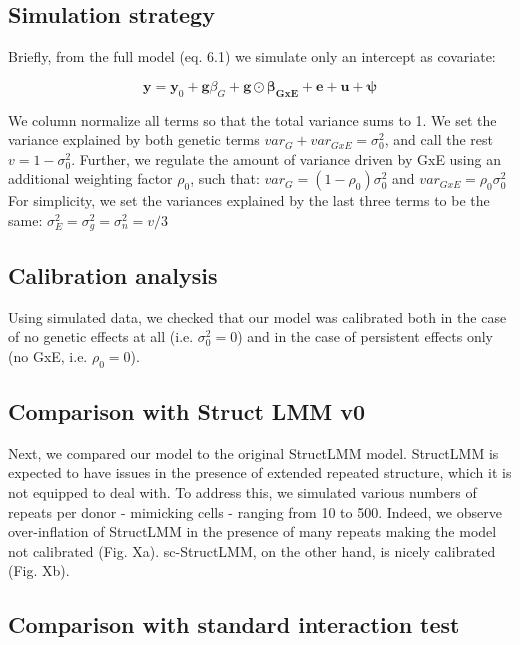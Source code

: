 \subsection{Simulation strategy}
Briefly, from the full model (eq. 6.1) we simulate only an intercept as covariate:  

\begin{equation}
 \mathbf{y} = \mathbf{y}_0 + \mathbf{g}\beta_G + \mathbf{g} \odot \boldsymbol{\beta_{GxE}} + \mathbf{e} + \mathbf{u} + \boldsymbol{\psi} 
\end{equation}

We column normalize all terms so that the total variance sums to 1.
We set the variance explained by both genetic terms $var_G+var_{GxE}=\sigma_0^2$, and call the rest $v = 1-\sigma_0^2$.
Further, we regulate the amount of variance driven by GxE using an additional weighting factor $\rho_0$, such that: $var_G = (1-\rho_0)\sigma_0^2$ and $var_{GxE} = \rho_0\sigma_0^2$
For simplicity, we set the variances explained by the last three terms to be the same:
$\sigma_E^2 = \sigma_g^2 = \sigma_n^2 = v/3$

\subsection{Calibration analysis}

Using simulated data, we checked that our model was calibrated both in the case of no genetic effects at all (i.e. $\sigma_0^2 = 0$) and in the case of persistent effects only (no GxE, i.e. $\rho_0 = 0$).

\subsection{Comparison with Struct LMM v0}

Next, we compared our model to the original StructLMM model.
StructLMM is expected to have issues in the presence of extended repeated structure, which it is not equipped to deal with.
To address this, we simulated various numbers of repeats per donor - mimicking cells -  ranging from 10 to 500.
Indeed, we observe over-inflation of StructLMM in the presence of many repeats making the model not calibrated (Fig. Xa).
sc-StructLMM, on the other hand, is nicely calibrated (Fig. Xb).

\subsection{Comparison with standard interaction test}

